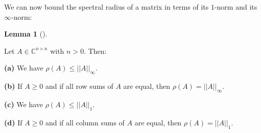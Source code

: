 \documentclass[numbers=enddot,12pt,final,onecolumn,notitlepage]{scrartcl}%
\numberwithin{exer}{subsection}
\theoremstyle{definition}
\newtheorem{lem}[theo]{Lemma}
\newenvironment{lemma}[1][]
{\begin{lem}[#1]\begin{leftbar}}
{\end{leftbar}\end{lem}}
\begin{document}
We can now bound the spectral radius of a matrix in terms of its $1$-norm and
its $\infty$-norm:

\begin{lemma}
\label{lem.posmat.rho-in-terms-of-norms}Let $A\in\mathbb{C}^{n\times n}$ with
$n>0$. Then: \medskip

\textbf{(a)} We have $\rho\left(  A\right)  \leq\left\vert \left\vert
A\right\vert \right\vert _{\infty}$. \medskip

\textbf{(b)} If $A\geq0$ and if all row sums of $A$ are equal, then
$\rho\left(  A\right)  =\left\vert \left\vert A\right\vert \right\vert
_{\infty}$. \medskip

\textbf{(c)} We have $\rho\left(  A\right)  \leq\left\vert \left\vert
A\right\vert \right\vert _{1}$. \medskip

\textbf{(d)} If $A\geq0$ and if all column sums of $A$ are equal, then
$\rho\left(  A\right)  =\left\vert \left\vert A\right\vert \right\vert _{1}$.
\end{lemma}
\end{document}
